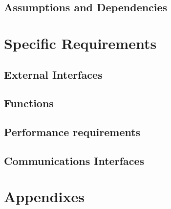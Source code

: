 \documentclass{article}
\begin{document}
	\subsection{Assumptions and Dependencies}

\section{Specific Requirements}
	\subsection{External Interfaces}
	\subsection{Functions}
	\subsection{Performance requirements}
	\subsection{Communications Interfaces}

\section{Appendixes}
\end{document}
